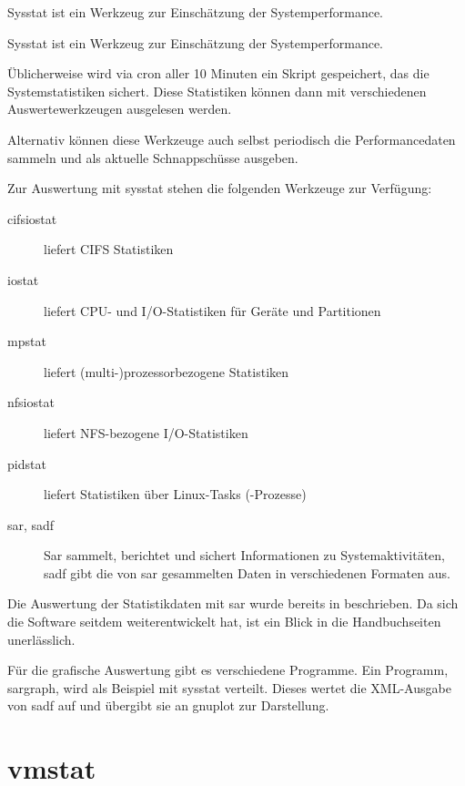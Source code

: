 \begin{abstractsec}
  Sysstat ist ein Werkzeug zur Einschätzung der Systemperformance.
\end{abstractsec}
\begin{normaltext}
  Sysstat ist ein Werkzeug zur Einschätzung der Systemperformance.

  Üblicherweise wird via cron aller 10 Minuten ein Skript gespeichert, das die
  Systemstatistiken sichert. Diese Statistiken können dann mit verschiedenen
  Auswertewerkzeugen ausgelesen werden.

  Alternativ können diese Werkzeuge auch selbst periodisch die
  Performancedaten sammeln und als aktuelle Schnappschüsse ausgeben.

  Zur Auswertung mit sysstat stehen die folgenden Werkzeuge zur Verfügung:
  \begin{description}
    \item[cifsiostat] liefert CIFS Statistiken
    \item[iostat] liefert CPU- und I/O-Statistiken für Geräte und Partitionen
    \item[mpstat] liefert (multi-)prozessorbezogene Statistiken
    \item[nfsiostat] liefert NFS-bezogene I/O-Statistiken
    \item[pidstat] liefert Statistiken über Linux-Tasks (-Prozesse)
    \item[sar, sadf] Sar sammelt, berichtet und sichert Informationen zu
      Systemaktivitäten, sadf gibt die von sar gesammelten Daten in
      verschiedenen Formaten aus.
  \end{description}

  Die Auswertung der Statistikdaten mit sar wurde bereits in
  \cite{Loukides:1996:SPT:547780} beschrieben. Da sich die Software seitdem
  weiterentwickelt hat, ist ein Blick in die Handbuchseiten unerlässlich.

  Für die grafische Auswertung gibt es verschiedene Programme. Ein
  Programm, sargraph, wird als Beispiel mit sysstat verteilt. Dieses wertet
  die XML-Ausgabe von sadf auf und übergibt sie an gnuplot zur Darstellung.
\end{normaltext}

\section{vmstat}
\label{sec:lokal-werkzeuge-vmstat}

